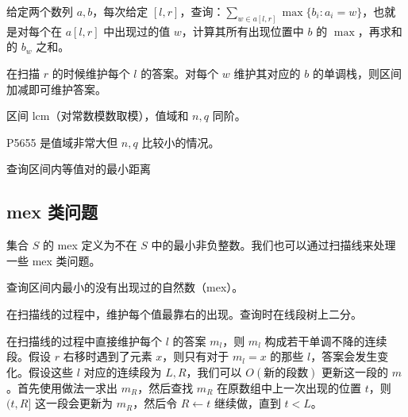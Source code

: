 \begin{example}
    给定两个数列 $a,b$，每次给定 $[l,r]$，查询：$\sum_{w\in a[l,r]} \max\{b_i:a_i=w\}$，也就是对每个在 $a[l,r]$ 中出现过的值 $w$，计算其所有出现位置中 $b$ 的 $\max$，再求和 的 $b_w$ 之和。
\end{example}
\begin{solution}
    在扫描 $r$ 的时候维护每个 $l$ 的答案。对每个 $w$ 维护其对应的 $b$ 的单调栈，则区间加减即可维护答案。
\end{solution}
\begin{exercise}[CF1422F]
    区间 lcm（对常数模数取模），值域和 $n,q$ 同阶。
\end{exercise}
\begin{remark}
    P5655 是值域非常大但 $n,q$ 比较小的情况。
\end{remark}


\begin{exercise}[CF522D]
    查询区间内等值对的最小距离
\end{exercise}


\subsection{mex 类问题}

集合 $S$ 的 mex 定义为不在 $S$ 中的最小非负整数。我们也可以通过扫描线来处理一些 mex 类问题。
\begin{example}[区间 mex]
    查询区间内最小的没有出现过的自然数（mex）。
\end{example}
\begin{solution}[做法一]
    在扫描线的过程中，维护每个值最靠右的出现。查询时在线段树上二分。
\end{solution}
\begin{solution}[做法二]
    在扫描线的过程中直接维护每个 $l$ 的答案 $m_l$，则 $m_l$ 构成若干单调不降的连续段。假设 $r$ 右移时遇到了元素 $x$，则只有对于 $m_l=x$ 的那些 $l$，答案会发生变化。假设这些 $l$ 对应的连续段为 $L,R$，我们可以 $O(\textbf{新的段数})$ 更新这一段的 $m$。首先使用做法一求出 $m_R$，然后查找 $m_R$ 在原数组中上一次出现的位置 $t$，则 $(t,R]$ 这一段会更新为 $m_R$，然后令 $R\gets t$ 继续做，直到 $t<L$。 
\end{solution}

